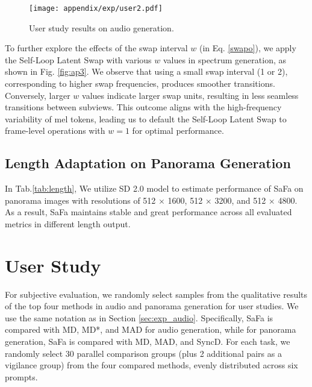 \begin{figure}[t]
    \centering
    \texttt{[image: appendix/exp/user2.pdf]}
    \vspace{-14pt}
    \caption{User study results on audio generation.}
      \vspace{-10pt}
\label{fig:user1}
\end{figure}

To further explore the effects of the swap interval $w$ (in Eq. \ref{swapo}), we apply the Self-Loop Latent Swap with various $w$ values in spectrum generation, as shown in Fig. \ref{fig:ap3}. We observe that using a small swap interval (1 or 2), corresponding to higher swap frequencies, produces smoother transitions. Conversely, larger $w$ values indicate larger swap units, resulting in less seamless transitions between subviews. This outcome aligns with the high-frequency variability of mel tokens, leading us to default the Self-Loop Latent Swap to frame-level operations with $w=1$ for optimal performance.

\subsection{Length Adaptation on Panorama Generation}

In Tab.\ref{tab:length}, We utilize SD 2.0 model to estimate performance of SaFa on panorama images with resolutions of 512 $\times$ 1600, 512 $\times$ 3200, and 512 $\times$ 4800. As a result, SaFa maintains stable and great performance across all evaluated metrics in different length output.

\section{User Study}
\label{user}
For subjective evaluation, we randomly select samples from the qualitative results of the top four methods in audio and panorama generation for user studies. We use the same notation as in Section \ref{sec:exp_audio}. Specifically, SaFa is compared with MD, MD*, and MAD for audio generation, while for panorama generation, SaFa is compared with MD, MAD, and SyncD. For each task, we randomly select 30 parallel comparison groups (plus 2 additional pairs as a vigilance group) from the four compared methods, evenly distributed across six prompts. 

